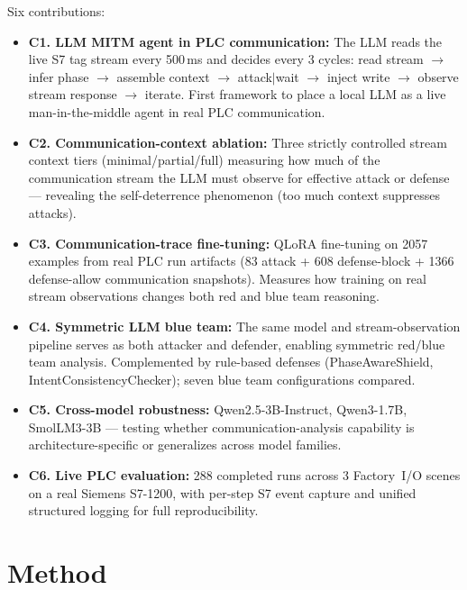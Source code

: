\documentclass[11pt]{article}
\begin{document}
Six contributions:
\begin{itemize}[leftmargin=1.5em]
    \item \textbf{C1. LLM MITM agent in PLC communication:} The LLM reads the live S7 tag stream every 500\,ms and decides every 3 cycles: read stream $\to$ infer phase $\to$ assemble context $\to$ attack$|$wait $\to$ inject write $\to$ observe stream response $\to$ iterate. First framework to place a local LLM as a live man-in-the-middle agent in real PLC communication.
    \item \textbf{C2. Communication-context ablation:} Three strictly controlled stream context tiers (minimal/partial/full) measuring how much of the communication stream the LLM must observe for effective attack or defense --- revealing the self-deterrence phenomenon (too much context suppresses attacks).
    \item \textbf{C3. Communication-trace fine-tuning:} QLoRA fine-tuning on 2057 examples from real PLC run artifacts (83 attack + 608 defense-block + 1366 defense-allow communication snapshots). Measures how training on real stream observations changes both red and blue team reasoning.
    \item \textbf{C4. Symmetric LLM blue team:} The same model and stream-observation pipeline serves as both attacker and defender, enabling symmetric red/blue team analysis. Complemented by rule-based defenses (PhaseAwareShield, IntentConsistencyChecker); seven blue team configurations compared.
    \item \textbf{C5. Cross-model robustness:} Qwen2.5-3B-Instruct, Qwen3-1.7B, SmolLM3-3B --- testing whether communication-analysis capability is architecture-specific or generalizes across model families.
    \item \textbf{C6. Live PLC evaluation:} 288 completed runs across 3 Factory~I/O scenes on a real Siemens S7-1200, with per-step S7 event capture and unified structured logging for full reproducibility.
\end{itemize}

\section*{Method}
\end{document}
